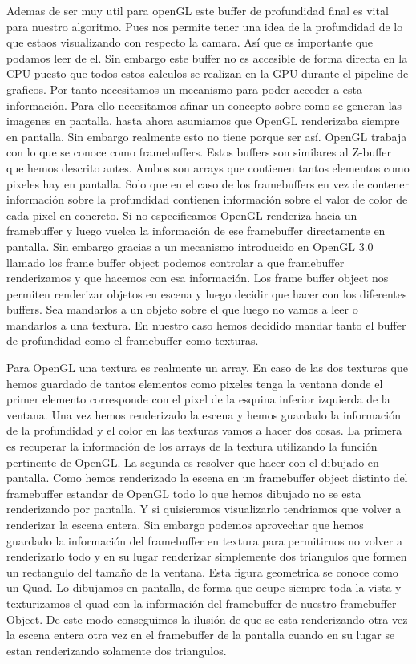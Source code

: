 Ademas de ser muy util para openGL este buffer de profundidad final es vital para nuestro algoritmo. Pues nos permite tener una idea de la profundidad de lo que estaos visualizando con respecto la camara. Así que es importante que podamos leer de el. Sin embargo este buffer no es accesible de forma directa en la CPU puesto que todos estos calculos se realizan en la GPU durante el pipeline de graficos. Por tanto necesitamos un mecanismo para poder acceder a esta información. Para ello necesitamos afinar un concepto sobre como se generan las imagenes en pantalla.
hasta ahora asumiamos que OpenGL renderizaba siempre en pantalla. Sin embargo realmente esto no tiene porque ser así. OpenGL trabaja con lo que se conoce como framebuffers. Estos buffers son similares al Z-buffer que hemos descrito antes. Ambos son arrays que contienen tantos elementos como pixeles hay en pantalla. Solo que en el caso de los framebuffers en vez de contener información sobre la profundidad contienen información sobre el valor de color de cada pixel en concreto. Si no especificamos
OpenGL renderiza hacia un framebuffer y luego vuelca la información de ese framebuffer directamente en pantalla. Sin embargo gracias a un mecanismo introducido en OpenGL 3.0 llamado los frame buffer object podemos controlar a que framebuffer renderizamos y que hacemos con esa información. Los frame buffer object nos permiten renderizar objetos en escena y luego decidir que hacer con los diferentes buffers. Sea mandarlos a un objeto sobre el que luego no vamos a leer o mandarlos a una textura. En nuestro caso hemos decidido mandar tanto el buffer de profundidad como
el framebuffer como texturas. \cite{khronosFramebufferObject}

Para OpenGL una textura es realmente un array. En caso de las dos texturas que hemos guardado de tantos elementos como pixeles tenga la ventana donde el primer elemento corresponde con el pixel de la esquina inferior izquierda de la ventana. Una vez hemos renderizado la escena y hemos guardado la información de la profundidad y el color en las texturas vamos a hacer dos cosas. La primera es recuperar la información de los arrays de la textura utilizando la función pertinente de OpenGL. La segunda es resolver que hacer con el dibujado en pantalla. Como hemos renderizado la escena
en un framebuffer object distinto del framebuffer estandar de OpenGL todo lo que hemos dibujado no se esta renderizando por pantalla. Y si quisieramos visualizarlo tendriamos que volver a renderizar la escena entera. Sin embargo podemos aprovechar que hemos guardado la información del framebuffer en textura para permitirnos no volver a renderizarlo todo y en su lugar renderizar simplemente dos triangulos que formen un rectangulo del tamaño de la ventana. Esta figura geometrica se conoce como un Quad. Lo dibujamos en pantalla, de forma que ocupe siempre toda la vista y texturizamos el quad 
con la información del framebuffer de nuestro framebuffer Object. De este modo conseguimos la ilusión de que se esta renderizando otra vez la escena entera otra vez en el framebuffer de la pantalla cuando en su lugar se estan renderizando solamente dos triangulos. 

